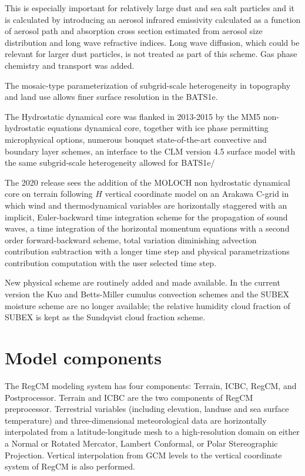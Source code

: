 This is especially important for relatively large dust and sea salt particles
and it is calculated by introducing an aerosol infrared emissivity calculated
as a function of aerosol path and absorption cross section estimated from
aerosol size distribution and long wave refractive indices. Long wave diffusion,
which could be relevant for larger dust particles, is not treated as part of
this scheme. Gas phase chemistry and transport was added.

The mosaic-type parameterization of subgrid-scale heterogeneity in
topography and land use \citep{Giorgi_03} allows finer surface resolution
in the \ac{BATS1e}.

The Hydrostatic dynamical core was flanked in 2013-2015 by the \ac{MM5}
non-hydrostatic equations dynamical core, together with ice phase permitting
microphysical options, numerous bouquet state-of-the-art convective and
boundary layer schemes, an interface to the \ac{CLM} version 4.5 surface model
with the same subgrid-scale heterogeneity allowed for \ac{BATS1e}/

The 2020 release sees the addition of the \ac{MOLOCH} non hydrostatic
dynamical core on terrain following $H$ vertical coordinate model on an
Arakawa C-grid in which wind and thermodynamical variables are horizontally
staggered with an implicit, Euler-backward time integration scheme for the
propagation of sound waves, a time integration of the horizontal momentum
equations with a second order forward-backward scheme, total variation
diminishing advection contribution subtraction with a longer time step and
physical parametrizations contribution computation with the user selected
time step.

New physical scheme are routinely added and made available.
In the current version the Kuo and Betts-Miller cumulus convection schemes
and the \ac{SUBEX} moisture scheme are no longer available; the relative
humidity cloud fraction of \ac{SUBEX} \citep{Sundqvist_89,Pal_00} is kept as
the Sundqvist cloud fraction scheme.

\section{Model components}

The \ac{RegCM} modeling system has four components: Terrain, ICBC, \ac{RegCM},
and Postprocessor.  Terrain and ICBC are the two components of \ac{RegCM}
preprocessor. Terrestrial variables (including elevation, landuse and sea
surface temperature) and three-dimensional meteorological data are
horizontally interpolated from a latitude-longitude mesh to a high-resolution
domain on either a Normal or Rotated Mercator, Lambert Conformal, or Polar
Stereographic Projection. Vertical interpolation from \ac{GCM} levels to the
vertical coordinate system of \ac{RegCM} is also performed.

